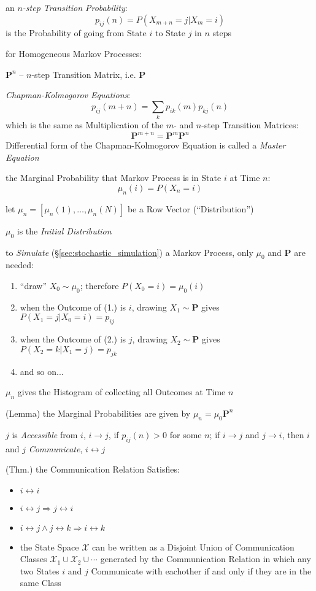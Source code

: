 an \emph{$n$-step Transition Probability}:
\[
  p_{ij}(n) = P(X_{m+n} = j | X_m = i)
\]
is the Probability of going from State $i$ to State $j$ in $n$ steps

for Homogeneous Markov Processes:

$\mathbf{P}^n$ -- $n$-step Transition Matrix, i.e. $\mathbf{P}$

\emph{Chapman-Kolmogorov Equations}:
\[
  p_{ij}(m + n) = \sum_k p_{ik}(m) p_{kj}(n)
\]
which is the same as Multiplication of the $m$- and $n$-step Transition
Matrices:
\[
  \mathbf{P}^{m+n} = \mathbf{P}^m \mathbf{P}^n
\]
Differential form of the Chapman-Kolmogorov Equation is called a
\emph{Master Equation}

the Marginal Probability that Markov Process is in State $i$ at Time $n$:
\[
  \mu_n(i) = P(X_n = i)
\]

let $\mu_n = [\mu_n(1), \ldots, \mu_n(N)]$ be a Row Vector (``Distribution'')

$\mu_0$ is the \emph{Initial Distribution}

to \emph{Simulate} (\S\ref{sec:stochastic_simulation}) a Markov Process, only
$\mu_0$ and $\mathbf{P}$ are needed:
\begin{enumerate}
  \item ``draw'' $X_0 \sim \mu_0$; therefore $P(X_0 = i) = \mu_0(i)$
  \item when the Outcome of (1.) is $i$, drawing $X_1 \sim \mathbf{P}$ gives
    $P(X_1 = j | X_0 = i) = p_{ij}$
  \item when the Outcome of (2.) is $j$, drawing $X_2 \sim \mathbf{P}$ gives
    $P(X_2 = k | X_1 = j) = p_{jk}$
  \item and so on...
\end{enumerate}

$\mu_n$ gives the Histogram of collecting all Outcomes at Time $n$

(Lemma) the Marginal Probabilities are given by $\mu_n = \mu_0 \mathbf{P}^n$

$j$ is \emph{Accessible} from $i$, $i \to j$, if $p_{ij}(n) > 0$ for
some $n$; if $i \to j$ and $j \to i$, then $i$ and $j$
\emph{Communicate}, $i \leftrightarrow j$

(Thm.) the Communication Relation Satisfies:
\begin{itemize}
  \item $i \leftrightarrow i$
  \item $i \leftrightarrow j \Longrightarrow j \leftrightarrow i$
  \item $i \leftrightarrow j \wedge j \leftrightarrow k \Longrightarrow
    i \leftrightarrow k$
  \item the State Space $\mathcal{X}$ can be written as a Disjoint Union of
    Communication Classes $\mathcal{X}_1 \cup \mathcal{X}_2 \cup \cdots$
    generated by the Communication Relation in which any two States $i$ and $j$
    Communicate with eachother if and only if they are in the same Class
\end{itemize}


